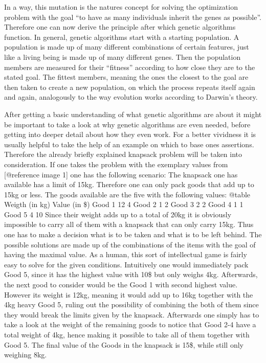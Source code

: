 \documentclass[11pt,a4paper]{article}
\begin{document}
In a way, this mutation is the natures concept for solving the optimization problem with the goal “to have as many individuals inherit the genes as possible”.
Therefore one can now derive the principle after which genetic algorithms function. In general, genetic algorithms start with a starting population. A population is made up of many different combinations of certain features, just like a living being is made up of many different genes. Then the population members are measured for their “fitness” according to how close they are to the stated goal. The fittest members, meaning the ones the closest to the goal are then taken to create a new population, on which the process repeats itself again and again, analogously to the way evolution works according to Darwin’s theory.

After getting a basic understanding of what genetic algorithms are about it might be important to take a look at why genetic algorithms are even needed, before getting into deeper detail about how they even work.
For a better vividness it is usually helpful to take the help of an example on which to base ones assertions. Therefore the already briefly explained knapsack problem will be taken into consideration.
If one takes the problem with the exemplary values from [@reference image 1] one has the following scenario:
The knapsack one has available has a limit of 15kg. Therefore one can only pack goods that add up to 15kg or less.
The goods available are the five with the following values:
@table
    Weigth (in kg)    Value (in \$)
Good 1    12    4
Good 2    1    2
Good 3    2    2
Good 4    1    1
Good 5    4    10
Since their weight adds up to a total of 20kg it is obviously impossible to carry all of them with a knapsack that can only carry 15kg. Thus one has to make a decision what is to be taken and what is to be left behind.
The possible solutions are made up of the combinations of the items with the goal of having the maximal value.
As a human, this sort of intellectual game is fairly easy to solve for the given conditions. Intuitively one would immediately pack Good 5, since it has the highest value with 10\$ but only weighs 4kg. Afterwards, the next good to consider would be the Good 1 with second highest value. However its weight is 12kg, meaning it would add up to 16kg together with the 4kg heavy Good 5, ruling out the possibility of combining the both of them since they would break the limits given by the knapsack.
Afterwards one simply has to take a look at the weight of the remaining goods to notice that Good 2-4 have a total weight of 4kg, hence making it possible to take all of them together with Good 5. The final value of the Goods in the knapsack is 15\$, while still only weighing 8kg.
\end{document}

